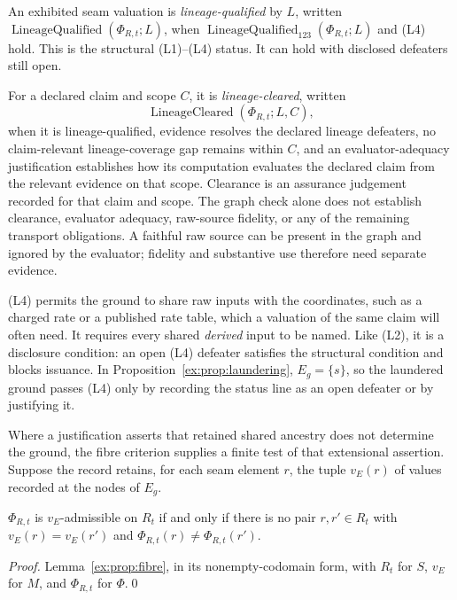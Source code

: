 \documentclass[smallextended,envcountsect,envcountsame,natbib]{svjour3}
\begin{document}
\begin{definition}\label{ex:def:lineage-qualified}
An exhibited seam valuation is \emph{lineage-qualified} by $L$, written $\operatorname{LineageQualified}(\Phi_{R,t};L)$, when $\operatorname{LineageQualified}_{123}(\Phi_{R,t};L)$ and (L4) hold. This is the structural (L1)--(L4) status. It can hold with disclosed defeaters still open.

For a declared claim and scope $C$, it is \emph{lineage-cleared}, written
\[
\operatorname{LineageCleared}(\Phi_{R,t};L,C),
\]
when it is lineage-qualified, evidence resolves the declared lineage defeaters, no claim-relevant lineage-coverage gap remains within $C$, and an evaluator-adequacy justification establishes how its computation evaluates the declared claim from the relevant evidence on that scope. Clearance is an assurance judgement recorded for that claim and scope. The graph check alone does not establish clearance, evaluator adequacy, raw-source fidelity, or any of the remaining transport obligations. A faithful raw source can be present in the graph and ignored by the evaluator; fidelity and substantive use therefore need separate evidence.
\end{definition}

(L4) permits the ground to share raw inputs with the coordinates, such as a charged rate or a published rate table, which a valuation of the same claim will often need. It requires every shared \emph{derived} input to be named. Like (L2), it is a disclosure condition: an open (L4) defeater satisfies the structural condition and blocks issuance. In Proposition~\ref{ex:prop:laundering}, $E_g=\{s\}$, so the laundered ground passes (L4) only by recording the status line as an open defeater or by justifying it.

Where a justification asserts that retained shared ancestry does not determine the ground, the fibre criterion supplies a finite test of that extensional assertion. Suppose the record retains, for each seam element $r$, the tuple $v_E(r)$ of values recorded at the nodes of $E_g$.

\begin{proposition}\label{ex:prop:laundering-test}
$\Phi_{R,t}$ is $v_E$-admissible on $R_t$ if and only if there is no pair $r,r'\in R_t$ with $v_E(r)=v_E(r')$ and $\Phi_{R,t}(r)\neq\Phi_{R,t}(r')$.
\end{proposition}
\begin{proof}
Lemma~\ref{ex:prop:fibre}, in its nonempty-codomain form, with $R_t$ for $S$, $v_E$ for $M$, and $\Phi_{R,t}$ for $\Phi$.\qed
\end{proof}
\end{document}
